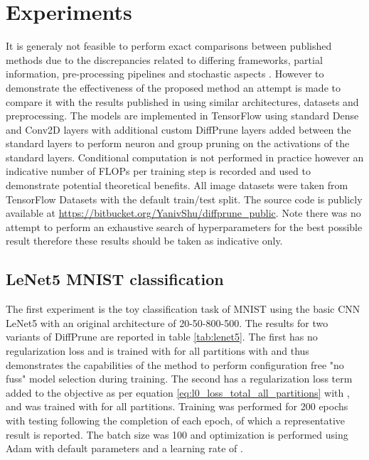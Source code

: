 \documentclass[final,1p,times]{elsarticle}
\begin{document}
\section{Experiments}
It is generaly not feasible to perform exact comparisons between published methods due to the discrepancies related to differing frameworks, partial information, pre-processing pipelines and stochastic aspects \cite{DBLP:conf/mlsys/BlalockOFG20}. However to demonstrate the effectiveness of the proposed method an attempt is made to compare it with the results published in \cite{louizos2018learning, Huang_2020_CVPR_Workshops} using similar architectures, datasets and preprocessing. The models are implemented in TensorFlow \cite{tensorflow2015-whitepaper} using standard Dense and Conv2D layers with additional custom DiffPrune layers added between the standard layers to perform neuron and group pruning on the activations of the standard layers. Conditional computation is not performed in practice however an indicative number of FLOPs per training step is recorded and used to demonstrate potential theoretical benefits. All image datasets were taken from TensorFlow Datasets \cite{TFDS} with the default train/test split. The source code is publicly available at \href{https://bitbucket.org/YanivShu/diffprune_public}{https://bitbucket.org/YanivShu/diffprune\_public}. Note there was no attempt to perform an exhaustive search of hyperparameters for the best possible result therefore these results should be taken as indicative only.

\subsection{LeNet5 MNIST classification}
The first experiment is the toy classification task of MNIST using the basic CNN LeNet5 \cite{Lecun98gradient-basedlearning} with an original architecture of 20-50-800-500. The results for two variants of DiffPrune are reported in table \ref{tab:lenet5}. The first has no regularization loss and  is trained with  for all partitions with  and thus demonstrates the capabilities of the method to perform configuration free "no fuss" model selection during training. The second has a regularization loss term added to the objective as per equation \eqref{eq:l0_loss_total_all_partitions} with ,  and  was trained with  for all partitions. Training was performed for 200 epochs with testing following the completion of each epoch, of which a representative result is reported. The batch size was 100 and optimization is performed using Adam with default parameters and a learning rate of .
\end{document}
